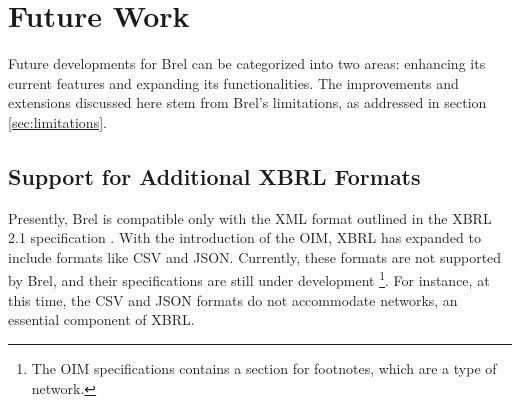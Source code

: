 
\section{Future Work}

Future developments for Brel can be categorized into two areas: 
enhancing its current features and expanding its functionalities. 
The improvements and extensions discussed here stem from Brel's limitations, 
as addressed in section \ref{sec:limitations}.



\subsection{Support for Additional XBRL Formats}

Presently, Brel is compatible only with the XML format outlined in the XBRL 2.1 specification \cite{xbrl21}.
With the introduction of the OIM, XBRL has expanded to include formats like CSV and JSON.
Currently, these formats are not supported by Brel, and their specifications are still under development
\footnote{The OIM specifications contains a section for footnotes, which are a type of network.}.
For instance, at this time, the CSV and JSON formats do not accommodate networks, an essential component of XBRL.

